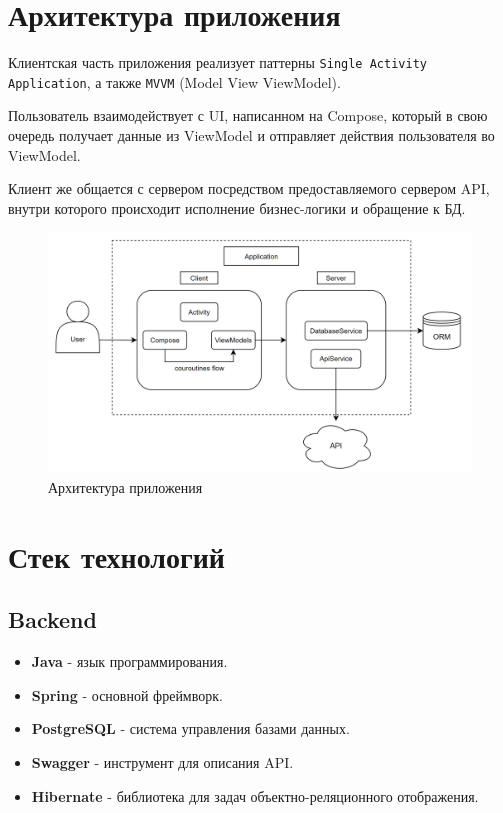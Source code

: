 \documentclass[a4paper, 14pt]{article}
\begin{document}
\section{Архитектура приложения}

Клиентская часть приложения реализует паттерны \texttt{Single Activity Application}, а также \texttt{MVVM} (Model View ViewModel).

Пользователь взаимодействует с UI, написанном на Compose, который в свою очередь получает данные из ViewModel и отправляет действия пользователя во ViewModel.

Клиент же общается с сервером посредством предоставляемого сервером API, внутри которого происходит исполнение бизнес-логики и обращение к БД.

\begin{figure}[H]
    \centering
    \includegraphics[width=17cm]{resources/2.png}
    \caption{Архитектура приложения}
\end{figure}

\section{Стек технологий}

\subsection{Backend}

\begin{itemize}
    \item \textbf{Java} - язык программирования.
    \item \textbf{Spring} - основной фреймворк.
    \item \textbf{PostgreSQL} - система управления базами данных.
    \item \textbf{Swagger} - инструмент для описания API.
    \item \textbf{Hibernate} - библиотека для задач объектно-реляционного отображения.
\end{itemize}
\end{document}
